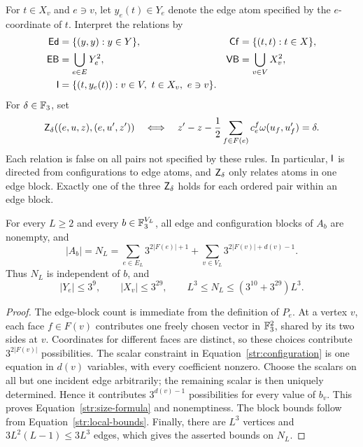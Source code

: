 For $t\in X_v$ and $e\ni v$, let $y_e(t)\in Y_e$ denote the edge atom
specified by the $e$-coordinate of $t$.  Interpret the relations by
\[
 \begin{aligned}
 \mathsf{Ed}&=\{(y,y):y\in Y\},&
 \mathsf{Cf}&=\{(t,t):t\in X\},\\
 \mathsf{EB}&=\bigcup_{e\in E}Y_e^2,&
 \mathsf{VB}&=\bigcup_{v\in V}X_v^2,\\
 \mathsf I&=\{(t,y_e(t)):v\in V,\ t\in X_v,\ e\ni v\}.&&
 \end{aligned}
\]
For $\delta\in\mathbb F_3$, set
\begin{equation}\label{str:z-relation}
 \mathsf Z_\delta((e,u,z),(e,u',z'))
 \quad\Longleftrightarrow\quad
 z'-z-\frac12\sum_{f\in F(e)}c^f_e\omega(u_f,u'_f)=\delta.
\end{equation}
Each relation is false on all pairs not specified by these rules.
In particular, $\mathsf I$ is directed from configurations to edge atoms, and
$\mathsf Z_\delta$ only relates atoms in one edge block.  Exactly one of the
three $\mathsf Z_\delta$ holds for each ordered pair within an edge block.

\begin{lemma}\label{str:size}
For every $L\ge2$ and every $b\in\mathbb F_3^{V_L}$, all edge and configuration
blocks of $A_b$ are nonempty, and
\begin{equation}\label{str:size-formula}
 |A_b|=N_L=
 \sum_{e\in E_L}3^{2|F(e)|+1}
 +\sum_{v\in V_L}3^{2|F(v)|+d(v)-1}.
\end{equation}
Thus $N_L$ is independent of $b$, and
\[
 |Y_e|\le3^9,\qquad |X_v|\le3^{29},\qquad
 L^3\le N_L\le(3^{10}+3^{29})L^3.
\]
\end{lemma}
\begin{proof}
The edge-block count is immediate from the definition of $P_e$.
At a vertex $v$, each face $f\in F(v)$ contributes one freely chosen
vector in $\mathbb F_3^2$, shared by its two sides at $v$.  Coordinates for different
faces are distinct, so these choices contribute $3^{2|F(v)|}$ possibilities.
The scalar constraint in Equation~\eqref{str:configuration} is one equation
in $d(v)$ variables, with every coefficient nonzero.  Choose the scalars
on all but one incident edge arbitrarily; the remaining scalar is then
uniquely determined.  Hence it contributes $3^{d(v)-1}$ possibilities
for every value of $b_v$.  This proves Equation~\eqref{str:size-formula}
and nonemptiness.  The block bounds follow from
Equation~\eqref{str:local-bounds}.  Finally, there are $L^3$ vertices and
$3L^2(L-1)\le3L^3$ edges, which gives the asserted bounds on $N_L$.
\end{proof}


